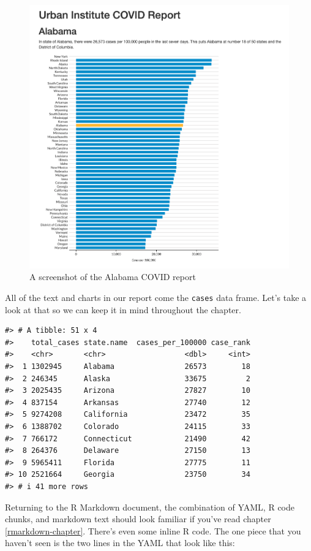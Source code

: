 \documentclass[
]{book}
\begin{document}
\begin{figure}
\includegraphics[width=1\linewidth]{assets/alabama-covid-report} \caption{A screenshot of the Alabama COVID report}\label{fig:alabama-covid-report}
\end{figure}

All of the text and charts in our report come the \texttt{cases} data frame. Let's take a look at that so we can keep it in mind throughout the chapter.

\begin{verbatim}
#> # A tibble: 51 x 4
#>    total_cases state.name  cases_per_100000 case_rank
#>    <chr>       <chr>                  <dbl>     <int>
#>  1 1302945     Alabama                26573        18
#>  2 246345      Alaska                 33675         2
#>  3 2025435     Arizona                27827        10
#>  4 837154      Arkansas               27740        12
#>  5 9274208     California             23472        35
#>  6 1388702     Colorado               24115        33
#>  7 766172      Connecticut            21490        42
#>  8 264376      Delaware               27150        13
#>  9 5965411     Florida                27775        11
#> 10 2521664     Georgia                23750        34
#> # i 41 more rows
\end{verbatim}

Returning to the R Markdown document, the combination of YAML, R code chunks, and markdown text should look familiar if you've read chapter \ref{rmarkdown-chapter}. There's even some inline R code. The one piece that you haven't seen is the two lines in the YAML that look like this:
\end{document}

